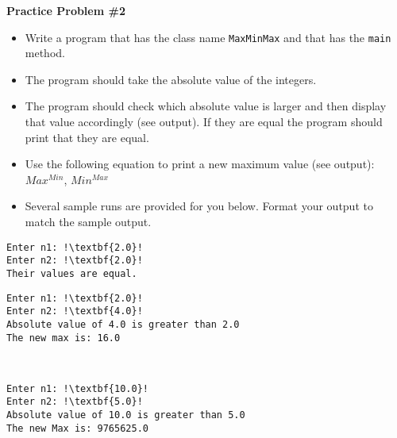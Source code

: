 \documentclass[12pt]{article}
\begin{document}
\vspace*{0.5cm}
\noindent\textbf{Practice Problem \#2}
\begin{itemize}
	\item Write a program that has the class name \texttt{MaxMinMax} and that has the \texttt{main} method.
	\item The program should take the absolute value of the integers.
	\item The program should check which absolute value is larger and then display that value accordingly (see output). If they are equal the program should print that they are equal.
	\item Use the following equation to print a new maximum value (see output): $Max^{Min}$, $Min^{Max}$
	\item Several sample runs are provided for you below. Format your output to match the sample output.
\end{itemize}
\begin{center}
\begin{minipage}{4cm}
\begin{lstlisting}[escapechar=!]
Enter n1: !\textbf{2.0}!
Enter n2: !\textbf{2.0}!
Their values are equal.
\end{lstlisting}
\end{minipage}
\hspace*{0.5cm}
\begin{minipage}{7cm}
\begin{lstlisting}[escapechar=!]
Enter n1: !\textbf{2.0}!
Enter n2: !\textbf{4.0}!
Absolute value of 4.0 is greater than 2.0
The new max is: 16.0
\end{lstlisting}
\end{minipage} \\
\vspace*{0.1cm}
\begin{minipage}{7cm}
\begin{lstlisting}[escapechar=!]
Enter n1: !\textbf{10.0}!
Enter n2: !\textbf{5.0}!
Absolute value of 10.0 is greater than 5.0
The new Max is: 9765625.0
\end{lstlisting}
\end{minipage} 
\end{center}	
\end{document}
